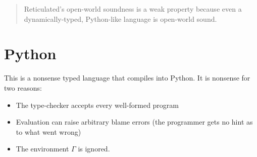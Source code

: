 \documentclass{article}
\begin{document}

\begin{abstract}
  Reticulated's open-world soundness is a weak property because even a dynamically-typed,
   Python-like language is open-world sound.
\end{abstract}

\tableofcontents


\section{Python}

This is a nonsense typed language that compiles into Python.
It is nonsense for two reasons:
\begin{itemize}
\item The type-checker accepts every well-formed program
\item Evaluation can raise arbitrary blame errors (the programmer gets no hint as to what went wrong)
\item The environment $\Gamma$ is ignored.
\end{itemize}

\begin{mathpar}







\end{mathpar}
\end{document}
